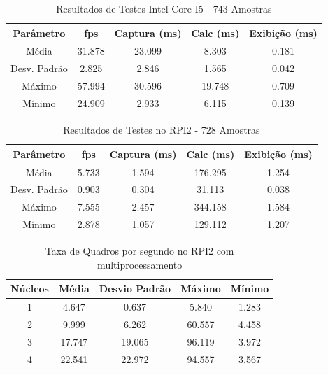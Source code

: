 \documentclass[conference]{IEEEtran}
\begin{document}
\begin{table}[h]\centering
\renewcommand{\arraystretch}{1.3}
\caption{Resultados de Testes Intel Core I5 - 743 Amostras}
\label{tab:table_pc}
\begin{tabular}{|c|c|c|c|c|}

\hline
\textbf{Parâmetro} & \textbf{fps} & \textbf{Captura (ms)} & \textbf{Calc (ms)} & \textbf{Exibição (ms)} \\\hline \hline
Média			& 31.878	& 23.099	&	8.303	&	0.181	\\ \hline
Desv. Padrão	& 2.825		& 2.846		&	1.565	&	0.042	\\ \hline
Máximo			& 57.994	& 30.596 	&	19.748	&	0.709	\\ \hline
Mínimo			& 24.909	& 2.933 	&	6.115	&	0.139	\\ \hline

\end{tabular}
\end{table}

\begin{table}[h]\centering
\renewcommand{\arraystretch}{1.3}
\caption{Resultados de Testes no RPI2 - 728 Amostras}
\label{tab:table_rpi}
\begin{tabular}{|c|c|c|c|c|}

\hline
\textbf{Parâmetro} & \textbf{fps} & \textbf{Captura (ms)} & \textbf{Calc (ms)} & \textbf{Exibição (ms)} \\\hline \hline
Média			& 5.733 & 1.594	&	176.295	&	1.254	\\ \hline
Desv. Padrão	& 0.903 & 0.304	&	31.113	&	0.038	\\ \hline
Máximo			& 7.555 & 2.457 &	344.158	&	1.584	\\ \hline
Mínimo			& 2.878 & 1.057 &	129.112	&	1.207	\\ \hline

\end{tabular}
\end{table}


\begin{table}[h]\centering
\renewcommand{\arraystretch}{1.3}
\caption{Taxa de Quadros por segundo no RPI2 com multiprocessamento}
\label{tab:table_rpi_cores_fps}
\begin{tabular}{|c|c|c|c|c|}

\hline
\textbf{Núcleos} & \textbf{Média} & \textbf{Desvio Padrão} & \textbf{Máximo} & \textbf{Mínimo} \\\hline \hline
1		& 4.647		& 0.637		&	5.840	&	1.283	\\ \hline
2		& 9.999		& 6.262		&	60.557	&	4.458	\\ \hline
3		& 17.747	& 19.065 	&	96.119	&	3.972	\\ \hline
4		& 22.541	& 22.972	&	94.557	&	3.567	\\ \hline

\end{tabular}
\end{table}
\end{document}
